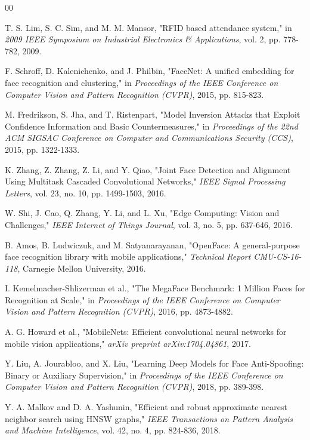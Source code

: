 \documentclass[conference]{IEEEtran}
\begin{document}
\begin{thebibliography}{00}

 T. S. Lim, S. C. Sim, and M. M. Mansor, "RFID based attendance system," in \textit{2009 IEEE Symposium on Industrial Electronics \& Applications}, vol. 2, pp. 778-782, 2009.

 F. Schroff, D. Kalenichenko, and J. Philbin, "FaceNet: A unified embedding for face recognition and clustering," in \textit{Proceedings of the IEEE Conference on Computer Vision and Pattern Recognition (CVPR)}, 2015, pp. 815-823.

 M. Fredrikson, S. Jha, and T. Ristenpart, "Model Inversion Attacks that Exploit Confidence Information and Basic Countermeasures," in \textit{Proceedings of the 22nd ACM SIGSAC Conference on Computer and Communications Security (CCS)}, 2015, pp. 1322-1333.

 K. Zhang, Z. Zhang, Z. Li, and Y. Qiao, "Joint Face Detection and Alignment Using Multitask Cascaded Convolutional Networks," \textit{IEEE Signal Processing Letters}, vol. 23, no. 10, pp. 1499-1503, 2016.

 W. Shi, J. Cao, Q. Zhang, Y. Li, and L. Xu, "Edge Computing: Vision and Challenges," \textit{IEEE Internet of Things Journal}, vol. 3, no. 5, pp. 637-646, 2016.

 B. Amos, B. Ludwiczuk, and M. Satyanarayanan, "OpenFace: A general-purpose face recognition library with mobile applications," \textit{Technical Report CMU-CS-16-118}, Carnegie Mellon University, 2016.

 I. Kemelmacher-Shlizerman et al., "The MegaFace Benchmark: 1 Million Faces for Recognition at Scale," in \textit{Proceedings of the IEEE Conference on Computer Vision and Pattern Recognition (CVPR)}, 2016, pp. 4873-4882.

 A. G. Howard et al., "MobileNets: Efficient convolutional neural networks for mobile vision applications," \textit{arXiv preprint arXiv:1704.04861}, 2017.

 Y. Liu, A. Jourabloo, and X. Liu, "Learning Deep Models for Face Anti-Spoofing: Binary or Auxiliary Supervision," in \textit{Proceedings of the IEEE Conference on Computer Vision and Pattern Recognition (CVPR)}, 2018, pp. 389-398.

 Y. A. Malkov and D. A. Yashunin, "Efficient and robust approximate nearest neighbor search using HNSW graphs," \textit{IEEE Transactions on Pattern Analysis and Machine Intelligence}, vol. 42, no. 4, pp. 824-836, 2018.


\end{thebibliography}
\end{document}
